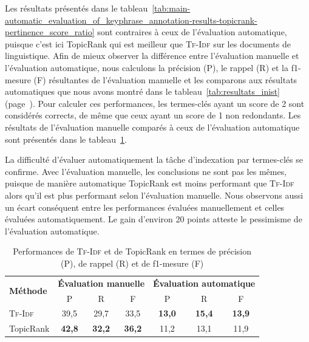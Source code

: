         Les résultats présentés dans le
        tableau~\ref{tab:main-automatic_evaluation_of_keyphrase_annotation-results-topicrank-pertinence_score_ratio}
        sont contraires à ceux de l'évaluation automatique, puisque c'est ici
        TopicRank qui est meilleur que \textsc{Tf-Idf} sur les documents de
        linguistique. Afin de mieux observer la différence entre l'évaluation
        manuelle et l'évaluation automatique, nous calculons la précision (P),
        le rappel (R) et la f1-mesure (F) résultantes de l'évaluation
        manuelle et les comparons aux résultats automatiques que nous avons
        montré dans le tableau~\ref{tab:resultats_inist}
        (page~\pageref{tab:resultats_inist}). Pour calculer ces performances,
        les termes-clés ayant un score de 2 sont considérés corrects, de même
        que ceux ayant un score de 1 non redondants. Les résultats de
        l'évaluation manuelle comparés à ceux de l'évaluation automatique sont
        présentés dans le
        tableau~\ref{tab:main-automatic_evaluation_of_keyphrase_annotation-results-topicrank-prf}.
        
        La difficulté d'évaluer automatiquement la tâche d'indexation par
        termes-clés se confir\-me. Avec l'évaluation manuelle, les conclusions ne
        sont pas les mêmes, puisque de manière automatique TopicRank est moins
        performant que \textsc{Tf-Idf} alors qu'il est plus performant selon
        l'évaluation manuelle. Nous observons aussi un écart conséquent entre
        les performances évaluées manuellement et celles évaluées
        automatiquement. Le gain d'environ 20 points atteste le pessimisme de
        l'évaluation automatique.
        \begin{table}[h!]
          \centering
          \begin{tabular}{l|c@{~~~~~~}cc|c@{~~~~~~~~}cc}
            \toprule
            \multirow{2}{*}{\textbf{Méthode}} & \multicolumn{3}{c|}{\textbf{Évaluation manuelle}} & \multicolumn{3}{c}{\textbf{Évaluation automatique}}\\
            \cline{2-7}
            & P & R & F & P & R & F\\
            \hline
            \textsc{Tf-Idf} & 39,5 & 29,7 & 33,5 & \textbf{13,0} & \textbf{15,4} & \textbf{13,9}\\
            TopicRank & \textbf{42,8} & \textbf{32,2} & \textbf{36,2} & 11,2 & 13,1 & 11,9\\
            \bottomrule
          \end{tabular}
          \caption[
            Performances de \textsc{Tf-Idf} et de TopicRank en termes de
            précision, de rappel et de f1-mesure
          ]{
            Performances de \textsc{Tf-Idf} et de TopicRank en termes de
            précision (P), de rappel (R) et de f1-mesure (F)
            \label{tab:main-automatic_evaluation_of_keyphrase_annotation-results-topicrank-prf}}
        \end{table}
      
